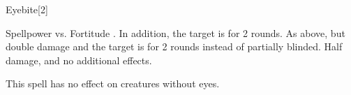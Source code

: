 \begin{spellsection}{Eyebite}[2]
    \begin{spellcontent}
        \begin{spelltargetinginfo}
        \end{spelltargetinginfo}
        \begin{spelleffects}
            \begin{spellattack}{Spellpower vs. Fortitude}
                \spellsuccess {}. In addition, the target is \partiallyblinded for 2 rounds.
                \spellcritical As above, but double damage and the target is \blinded for 2 rounds instead of partially blinded.
                \spellfailure Half damage, and no additional effects.
            \end{spellattack}
        \end{spelleffects}
    \end{spellcontent}
    \begin{spellfooter}
        \spellnotes This spell has no effect on creatures without eyes.
        \miscastrandom
    \end{spellfooter}
    \begin{spellaugments}
    \end{spellaugments}
\end{spellsection}


